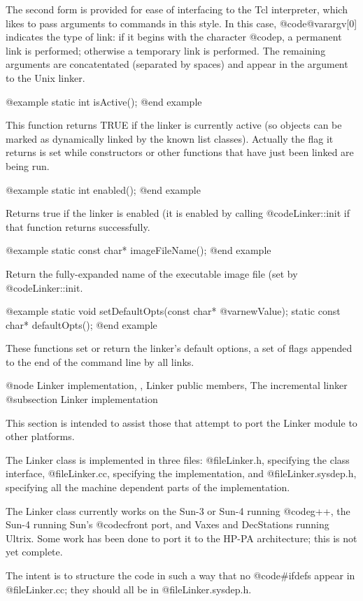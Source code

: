 The second form is provided for ease of interfacing to the Tcl
interpreter, which likes to pass arguments to commands in this
style.  In this case, @code{@var{argv}[0]} indicates the type of
link: if it begins with the character @code{p}, a permanent link
is performed; otherwise a temporary link is performed.  The remaining
arguments are concatentated (separated by spaces) and appear in the
argument to the Unix linker.

@example
static int isActive();
@end example


This function returns TRUE if the linker is currently active (so objects
can be marked as dynamically linked by the known list classes).
Actually the flag it returns is set while constructors or other
functions that have just been linked are being run.

@example
static int enabled();
@end example

Returns true if the linker is enabled (it is enabled by calling
@code{Linker::init} if that function returns successfully.

@example
static const char* imageFileName();
@end example

Return the fully-expanded name of the executable image file (set by
@code{Linker::init}.

@example
static void setDefaultOpts(const char* @var{newValue});
static const char* defaultOpts();
@end example

These functions set or return the linker's default options, a set of
flags appended to the end of the command line by all links.

@node Linker implementation,  , Linker public members, The incremental linker
@subsection Linker implementation

This section is intended to assist those that attempt to port the
Linker module to other platforms.

The Linker class is implemented in three files: @file{Linker.h},
specifying the class interface, @file{Linker.cc}, specifying the
implementation, and @file{Linker.sysdep.h}, specifying all the machine
dependent parts of the implementation.

The Linker class currently works on the Sun-3 or Sun-4 running
@code{g++}, the Sun-4 running Sun's @code{cfront} port, and
Vaxes and DecStations running Ultrix.  Some work has been done to
port it to the HP-PA architecture; this is not yet complete.

The intent is to structure the code in such a way that no @code{#ifdef}s
appear in @file{Linker.cc}; they should all be in @file{Linker.sysdep.h}.

